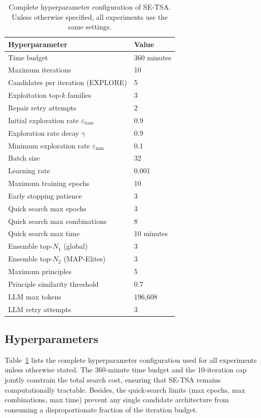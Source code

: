 \begin{nolinenumbers}
\begin{table}[htbp]
\caption{Complete hyperparameter configuration of SE-TSA. Unless otherwise specified, all experiments use the same settings.}
\label{tab:hyperparams}
\centering
\small
\begin{tabular}{ll}
\toprule
Hyperparameter & Value \\
\midrule
Time budget & 360 minutes \\
Maximum iterations & 10 \\
Candidates per iteration (EXPLORE) & 5 \\
Exploitation top-$k$ families & 3 \\
Repair retry attempts & 2 \\
Initial exploration rate $\varepsilon_{\text{base}}$ & 0.9 \\
Exploration rate decay $\gamma$ & 0.9 \\
Minimum exploration rate $\varepsilon_{\text{min}}$ & 0.1 \\
Batch size & 32 \\
Learning rate & 0.001 \\
Maximum training epochs & 10 \\
Early stopping patience & 3 \\
Quick search max epochs & 3 \\
Quick search max combinations & 8 \\
Quick search max time & 10 minutes \\
Ensemble top-$N_1$ (global) & 3 \\
Ensemble top-$N_2$ (MAP-Elites) & 3 \\
Maximum principles & 5 \\
Principle similarity threshold & 0.7 \\
LLM max tokens & 196,608 \\
LLM retry attempts & 3 \\
\bottomrule
\end{tabular}
\end{table}
\end{nolinenumbers}

\subsection{Hyperparameters}

Table~\ref{tab:hyperparams} lists the complete hyperparameter configuration used for all experiments unless otherwise stated. The 360-minute time budget and the 10-iteration cap jointly constrain the total search cost, ensuring that SE-TSA remains computationally tractable. Besides, the quick-search limits (max epochs, max combinations, max time) prevent any single candidate architecture from consuming a disproportionate fraction of the iteration budget.

